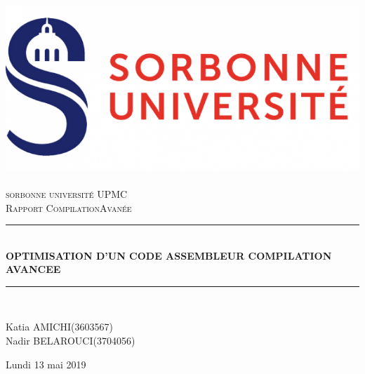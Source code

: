 \documentclass[11pt, openany]{article}
\newcommand{\HRule}{\rule{\linewidth}{0.5mm}}
\begin{document}
\begin{titlepage}
\begin{sffamily}
\begin{center}

\includegraphics[scale=0.4]{images/LOGO_SU_HORIZ_SEUL_RVB.png}~\\[1.5cm]

\textsc{\textmd{\LARGE sorbonne université UPMC}}\\[2cm]

\textsc{\textmd{\Large Rapport CompilationAvanée}}\\[1.5cm]

\HRule \\[0.4cm]
\textbf{\Large  OPTIMISATION D'UN CODE
ASSEMBLEUR COMPILATION AVANCEE \\[0.4cm] }

\HRule \\[1cm]

\begin{minipage}{0.4\textwidth}
\begin{flushleft} \normalsize
Katia AMICHI(3603567)\\
Nadir BELAROUCI(3704056)\\
\end{flushleft}
\end{minipage}

\vfill

{Lundi 13 mai 2019}

\end{center}
\end{sffamily}
\end{titlepage}

\newpage

\tableofcontents
\end{document}
